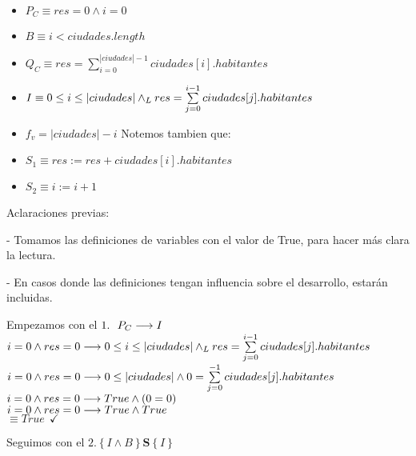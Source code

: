\documentclass[10pt,a4paper]{article}
\begin{document}
\begin{itemize}\setlength\itemsep{0.2cm}
    \item $P_C \equiv res=0 \land i=0$ \label{PC}
    \item $B \equiv i < ciudades.length$
    \item $Q_C \equiv res=  \sum\limits_{i=0}^{|ciudades|-1} ciudades[i].habitantes$ \label{QC}
    \item $I \equiv 0 \leq i \leq |ciudades| \land _L res = \sum\limits_{j=0}^{i-1} ciudades[j].habitantes$ \label{invariante}
    \item $f_v = |ciudades| - i$ \label{fv}
 \vspace{0.2cm}
    Notemos tambien que:
    \item $S_1 \equiv res := res + ciudades[i].habitantes$ \label{S1}
    \item $S_2 \equiv i := i + 1$ \label{S2}

\end{itemize}

Aclaraciones previas: 

- Tomamos las definiciones de variables con el valor de True, para hacer más clara la lectura.

- En casos donde las definiciones tengan influencia sobre el desarrollo, estarán incluidas. 

\newpage

Empezamos con el $1.\ \ P_C \longrightarrow I$ \\

$i = 0 \land res = 0  \longrightarrow 0 \leq i \leq |ciudades| \land _L res = \sum\limits_{j=0}^{i-1} ciudades[j].habitantes$ \\

$i = 0 \land res = 0 \longrightarrow 0 \leq |ciudades| \land 0 = \sum\limits_{j=0}^{-1} ciudades[j].habitantes$ \\

$i = 0 \land res = 0 \longrightarrow True \land (0 = 0)$ \\

$i = 0 \land res = 0 \longrightarrow True \land True$ \\

$\equiv True \ \ \checkmark$

\vspace{0.3cm}

Seguimos con el $2. \left\{I \wedge B \right\} \mathbf{S}\left\{I\right\}$ \\

\vspace{0.3cm}
\end{document}

